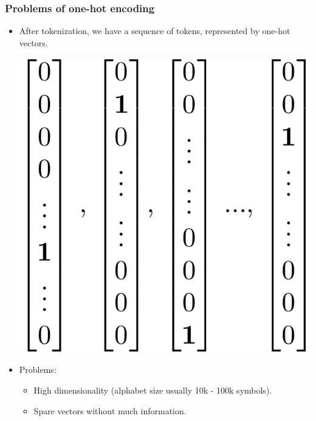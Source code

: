 \documentclass{beamer}
\begin{document}
\begin{frame}
	\frametitle{Problems of one-hot encoding}
	\pause
	\begin{itemize}
		\item After tokenization, we have a sequence of tokens, represented by one-hot vectors.
		\begin{center}
			\includegraphics[scale=0.18]{one_hot_sequence}		
		\end{center}
	\pause	
	\item Problems:
	\begin{itemize}		
		\item High dimensionality (alphabet size usually 10k - 100k symbols).
		\item Spare vectors without much information.
		
	\end{itemize}
		
	\end{itemize}
\end{frame}
	
\end{document}
